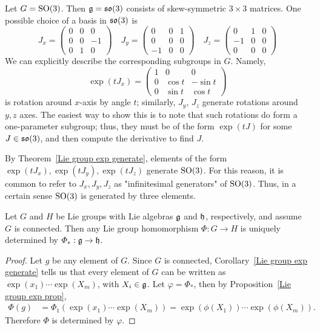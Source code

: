\begin{example}
Let $G=\mathrm{SO}(3)$. Then $\mathfrak{g}=\mathfrak{so}(3)$ consists of skew-symmetric $3\times 3$ matrices. One possible choice of a basis in $\mathfrak{so}(3)$ is
\[J_x=\begin{pmatrix}
0&0&0\\
0&0&-1\\
0&1&0
\end{pmatrix}\quad J_y=\begin{pmatrix}
0&0&1\\
0&0&0\\
-1&0&0
\end{pmatrix}\quad J_z=\begin{pmatrix}
0&1&0\\
-1&0&0\\
0&0&0
\end{pmatrix}\]
We can explicitly describe the corresponding subgroups in $G$. Namely,
\[\exp(tJ_x)=\begin{pmatrix}
1&0&0\\
0&\cos t&-\sin t\\
0&\sin t&\cos t
\end{pmatrix}\]
is rotation around $x$-axis by angle $t$; similarly, $J_y$, $J_z$ generate rotations around $y,z$ axes. The easiest way to show this is to note that such rotations do form a one-parameter subgroup; thus, they must be of the form $\exp(tJ)$ for some $J\in\mathfrak{so}(3)$, and then compute the derivative to find $J$.\par
By Theorem~\ref{Lie group exp generate}, elements of the form $\exp(tJ_x),\exp(tJ_y),\exp(tJ_z)$ generate $\mathrm{SO}(3)$. For this reason, it is common to refer to $J_x,J_y,J_z$ as "infinitesimal generators" of $\mathrm{SO}(3)$. Thus, in a certain sense $\mathrm{SO}(3)$ is generated by three elements.
\end{example}
\begin{corollary}\label{Lie group homo is uniquely determined by algebra homo}
Let $G$ and $H$ be Lie groups with Lie algebras $\mathfrak{g}$ and $\mathfrak{h}$, respectively, and assume $G$ is connected. Then any Lie group homomorphism $\varPhi:G\to H$ is uniquely determined by $\varPhi_*:\mathfrak{g}\to\mathfrak{h}$.
\end{corollary}
\begin{proof}
Let $g$ be any element of $G$. Since $G$ is connected, Corollary~\ref{Lie group exp generate} tells us that every element of $G$ can be written as $\exp(x_1)\cdots\exp(X_m)$, with $X_i\in\mathfrak{g}$. Let $\varphi=\varPhi_*$, then by Proposition~\ref{Lie group exp prop},
\begin{align*}
\varPhi(g)&=\varPhi_1(\exp(x_1)\cdots\exp(X_m))=\exp(\phi(X_1))\cdots\exp(\phi(X_m)).
\end{align*}
Therefore $\varPhi$ is determined by $\varphi$.
\end{proof}
